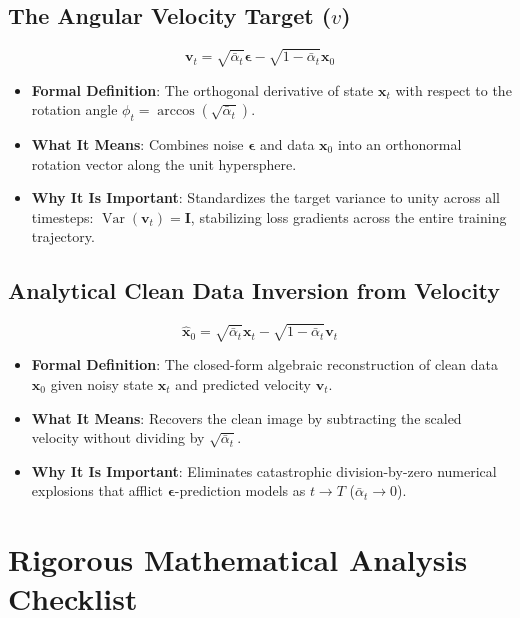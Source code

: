 \documentclass[11pt,a4paper]{article}
\theoremstyle{definition}
\begin{document}
\subsection{The Angular Velocity Target ($v$)}
{\boldmath
\begin{equation}
\mathbf{v}_t = \sqrt{\bar{\alpha}_t}\boldsymbol{\epsilon} - \sqrt{1 - \bar{\alpha}_t}\mathbf{x}_0
\end{equation}
}
\begin{itemize}
    \item \textbf{Formal Definition}: The orthogonal derivative of state $\mathbf{x}_t$ with respect to the rotation angle $\phi_t = \arccos(\sqrt{\bar{\alpha}_t})$.
    \item \textbf{What It Means}: Combines noise $\boldsymbol{\epsilon}$ and data $\mathbf{x}_0$ into an orthonormal rotation vector along the unit hypersphere.
    \item \textbf{Why It Is Important}: Standardizes the target variance to unity across all timesteps: $\operatorname{Var}(\mathbf{v}_t) = \mathbf{I}$, stabilizing loss gradients across the entire training trajectory.
\end{itemize}

\subsection{Analytical Clean Data Inversion from Velocity}
{\boldmath
\begin{equation}
\hat{\mathbf{x}}_0 = \sqrt{\bar{\alpha}_t}\mathbf{x}_t - \sqrt{1 - \bar{\alpha}_t}\mathbf{v}_t
\end{equation}
}
\begin{itemize}
    \item \textbf{Formal Definition}: The closed-form algebraic reconstruction of clean data $\mathbf{x}_0$ given noisy state $\mathbf{x}_t$ and predicted velocity $\mathbf{v}_t$.
    \item \textbf{What It Means}: Recovers the clean image by subtracting the scaled velocity without dividing by $\sqrt{\bar{\alpha}_t}$.
    \item \textbf{Why It Is Important}: Eliminates catastrophic division-by-zero numerical explosions that afflict $\boldsymbol{\epsilon}$-prediction models as $t \to T$ ($\bar{\alpha}_t \to 0$).
\end{itemize}

\section{Rigorous Mathematical Analysis Checklist}
\end{document}
